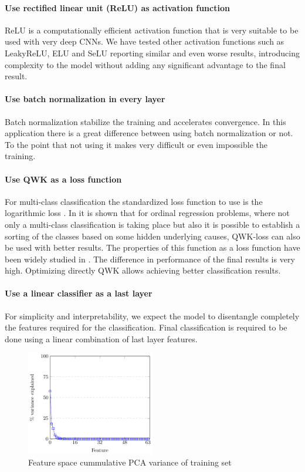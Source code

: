\documentclass[review]{elsarticle}
\theoremstyle{definition} %
\theoremstyle{remark}
\begin{document}
\paragraph{Use rectified linear unit (ReLU) as activation function} ReLU is a computationally efficient activation function that is very suitable to be used with very deep CNNs\cite{Dahl2013}. We have tested other activation functions such as LeakyReLU, ELU and SeLU reporting similar and even worse results, introducing complexity to the model without adding any significant advantage to the final result.

\paragraph{Use batch normalization in every layer} Batch normalization \cite{batch-norm} stabilize the training and accelerates convergence. In this application there is a great difference between using batch normalization or not. To the point that not using it makes very difficult or even impossible the training.

\paragraph{Use QWK as a loss function} For multi-class classification the standardized loss function to use is the logarithmic loss \cite{Goodfellow-et-al-2016}. In \cite{DELATORRE2017} it is shown that for ordinal regression problems, where not only a multi-class classification is taking place but also it is possible to establish a sorting of the classes based on some hidden underlying causes, QWK-loss can also be used with better results. The properties of this function as a loss function have been widely studied in \cite{DELATORRE2017}. The difference in performance of the final results is very high. Optimizing directly QWK allows achieving better classification results.

\paragraph{Use a linear classifier as a last layer} For simplicity and interpretability, we expect the model to disentangle completely the features required for the classification. Final classification is required to be done using a linear combination of last layer features.

\begin{figure}[ht!]
	\centering
	\includegraphics[width=0.50\textwidth]{./figures/PCA_feature_space.pdf}
	\caption{Feature space cummulative PCA variance of training set}
	\label{fig:pca_graph}
\end{figure}
\end{document}
